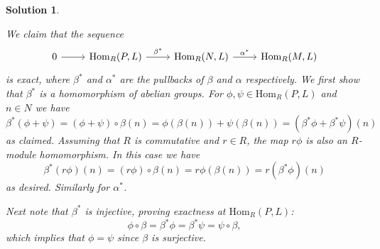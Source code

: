 \documentclass[article, a4paper, 11pt, oneside]{memoir}
\numberwithin{equation}{chapter}
\newcommand{\Hom}{\mathrm{Hom}}
\theoremstyle{nonumberplain}
\newtheorem{solution}{Solution}
\begin{document}
\begin{solution}
\begin{solutionsec}
    \item We claim that the sequence
    \begin{equation*}
        \begin{tikzcd}
            0
                \ar[r]
            & \Hom_R(P,L)
                \ar[r, "\beta^*"]
            & \Hom_R(N,L)
                \ar[r, "\alpha^*"]
            & \Hom_R(M,L)
        \end{tikzcd}
    \end{equation*}
    is exact, where $\beta^*$ and $\alpha^*$ are the pullbacks of $\beta$ and $\alpha$ respectively. We first show that $\beta^*$ is a homomorphism of abelian groups. For $\phi, \psi \in \Hom_R(P,L)$ and $n \in N$ we have
    \begin{equation*}
        \beta^*(\phi + \psi)
            = (\phi + \psi) \circ \beta(n)
            = \phi(\beta(n)) + \psi(\beta(n))
            = (\beta^*\phi + \beta^*\psi)(n)
    \end{equation*}
    as claimed. Assuming that $R$ is commutative and $r \in R$, the map $r\phi$ is also an $R$-module homomorphism. In this case we have
    \begin{equation*}
        \beta^*(r\phi)(n)
            = (r\phi) \circ \beta(n)
            = r\phi(\beta(n))
            = r(\beta^*\phi)(n)
    \end{equation*}
    as desired. Similarly for $\alpha^*$.

    Next note that $\beta^*$ is injective, proving exactness at $\Hom_R(P,L)$:
    \begin{equation*}
        \phi \circ \beta
            = \beta^*\phi
            = \beta^*\psi
            = \psi \circ \beta,
    \end{equation*}
    which implies that $\phi = \psi$ since $\beta$ is surjective.


\end{solutionsec}
\end{solution}
\end{document}
